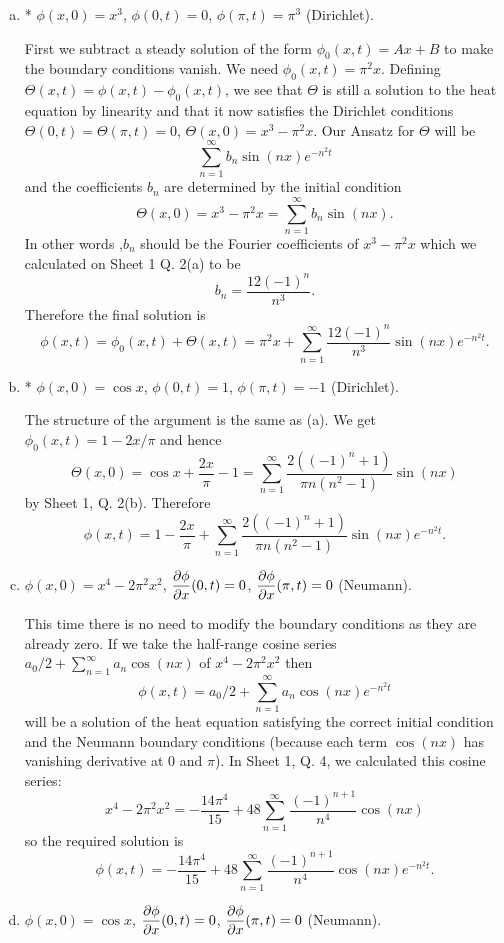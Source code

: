 \documentclass[12pt]{article}
\begin{document}
\begin{answer}
\begin{enumerate}[(a)]
\item * $\phi(x,0)=x^3$, $\phi(0,t)=0$, $\phi(\pi,t)=\pi^3$ (Dirichlet).

First we subtract a steady solution of the form $\phi_0(x,t)=Ax+B$ to make the boundary conditions vanish. We need $\phi_0(x,t)=\pi^2x$. Defining $\Theta(x,t)=\phi(x,t)-\phi_0(x,t)$, we see that $\Theta$ is still a solution to the heat equation by linearity and that it now satisfies the Dirichlet conditions $\Theta(0,t)=\Theta(\pi,t)=0$, $\Theta(x,0)=x^3-\pi^2x$.
Our Ansatz for $\Theta$ will be
\[\sum_{n=1}^{\infty}b_n\sin(nx)e^{-n^2t}\]
and the coefficients $b_n$ are determined by the initial condition
\[\Theta(x,0)=x^3-\pi^2x=\sum_{n=1}^{\infty}b_n\sin(nx).\]
In other words ,$b_n$ should be the Fourier coefficients of $x^3-\pi^2x$ which we calculated on Sheet 1 Q. 2(a) to be
\[b_n=\frac{12(-1)^n}{n^3}.\]
Therefore the final solution is
\[\phi(x,t)=\phi_0(x,t)+\Theta(x,t)=\pi^2x+\sum_{n=1}^{\infty}\frac{12(-1)^n}{n^3}\sin(nx)e^{-n^2t}.\]
\item * $\phi(x,0)=\cos x$, $\phi(0,t)=1$, $\phi(\pi,t)=-1$ (Dirichlet).

The structure of the argument is the same as (a). We get $\phi_0(x,t)=1-2x/\pi$ and hence
\[\Theta(x,0)=\cos x+\frac{2x}{\pi}-1=\sum_{n=1}^{\infty}\frac{2((-1)^n+1)}{\pi n(n^2-1)}\sin(nx)\]
by Sheet 1, Q. 2(b). Therefore
\[\phi(x,t)=1-\frac{2x}{\pi}+\sum_{n=1}^{\infty}\frac{2((-1)^n+1)}{\pi n(n^2-1)}\sin(nx)e^{-n^2t}.\]
\item $\phi(x,0)=x^4-2\pi^2 x^2$, $\dfrac{\partial \phi}{\partial x}(0,t)=0$, $\dfrac{\partial \phi}{\partial x}(\pi,t)=0$ (Neumann).

This time there is no need to modify the boundary conditions as they are already zero. If we take the half-range cosine series $a_0/2+\sum_{n=1}^{\infty}a_n\cos(nx)$ of $x^4-2\pi^2x^2$ then
\[\phi(x,t)=a_0/2+\sum_{n=1}^{\infty}a_n\cos(nx)e^{-n^2t}\]
will be a solution of the heat equation satisfying the correct initial condition and the Neumann boundary conditions (because each term $\cos(nx)$ has vanishing derivative at $0$ and $\pi$). In Sheet 1, Q. 4, we calculated this cosine series:
\[x^4-2\pi^2x^2=-\frac{14\pi^4}{15}+48\sum_{n=1}^{\infty}\frac{(-1)^{n+1}}{n^4}\cos(nx)\]
so the required solution is
\[\phi(x,t)=-\frac{14\pi^4}{15}+48\sum_{n=1}^{\infty}\frac{(-1)^{n+1}}{n^4}\cos(nx)e^{-n^2t}.\]
\item $\phi(x,0)=\cos x$, $\dfrac{\partial \phi}{\partial x}(0,t)=0$, $\dfrac{\partial \phi}{\partial x}(\pi,t)=0$ (Neumann).


\end{enumerate}
\end{answer}
\end{document}
